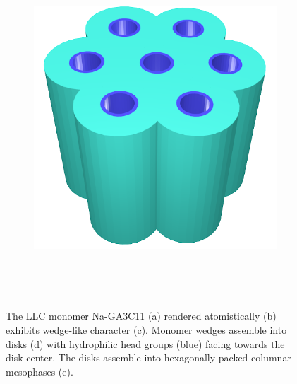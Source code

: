 \documentclass[journal=jpcbfk,manusciprt=article]{achemso}
\begin{document}
\begin{figure}
\begin{subfigure}{0.4\linewidth}
		\caption{}~\label{fig:wedge_layer}
	\end{subfigure}
	\begin{subfigure}{0.4\linewidth}
		\centering
		\includegraphics[width=\textwidth]{hexagonal_packing.png}
		\caption{}~\label{fig:hex_packing_simple}
	\end{subfigure}
	\caption{The LLC monomer Na-GA3C11 (a) rendered atomistically (b)
	exhibits wedge-like character (c). Monomer wedges assemble into disks (d) with
	hydrophilic head groups (blue) facing towards the disk center. The disks
	assemble into hexagonally packed columnar mesophases (e).}~\label{fig:assembly}
  \end{figure}
\end{document}
